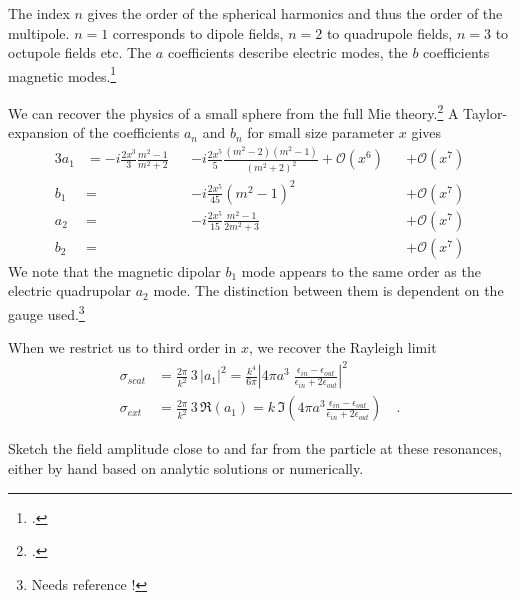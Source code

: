 The index $n$ gives the order of the spherical harmonics and thus the order of the multipole. $n=1$ corresponds to dipole fields, $n=2$ to quadrupole fields, $n=3$ to octupole fields etc. The $a$ coefficients describe electric modes, the $b$ coefficients magnetic modes.\footcite{KV-book, BH-book} 


We can recover the physics of a small sphere from the full Mie theory.\footcite[chapter 5]{BH-book} A Taylor-expansion of the coefficients $a_n$ and $b_n$ for small size parameter $x$ gives
\begin{alignat}{3}
 a_1 &= -i \frac{2x^3}{3} \frac{m^2 -1}{m^2 + 2} && -i \frac{2x^5}{5} \frac{(m^2 -2)(m^2-1)}{(m^2 + 2)^2} + \mathcal{O}(x^6)  && + \mathcal{O}(x^7) \\
 b_1 &=  && -i \frac{2x^5}{45} (m^2 -1)^2  &&+ \mathcal{O}(x^7)  \\
 a_2 &=   &&-i \frac{2x^5}{15} \frac{m^2-1}{2 m^2 +3} &&+ \mathcal{O}(x^7)  \\
b_2 &= && &&+ \mathcal{O}(x^7)  
\end{alignat}
We note that the magnetic dipolar $b_1$ mode appears to the same order as the electric quadrupolar $a_2$ mode. The distinction between them is dependent on the gauge used.\footnote{Needs reference !}

When we restrict us to third order in $x$, we recover the Rayleigh limit
\begin{eqnarray}
\sigma_{scat} & = \frac{2 \pi }{k^2} \, 3 \, \left| a_1 \right|^2 
 = \frac{k^4}{6 \pi} \left| 4 \pi a^3  \; \frac{\epsilon_{in} - \epsilon_{out}}{\epsilon_{in} + 2 \epsilon_{out}} \right|^2 \\
\sigma_{ext} & = \frac{2 \pi }{k^2} \, 3 \, \Re \left( a_1 \right) 
= k \, \Im \left( 4 \pi a^3 \frac{\epsilon_{in} - \epsilon_{out}}{\epsilon_{in} + 2 \epsilon_{out}}  \right) \quad .
\end{eqnarray}



\begin{questions}
\item Sketch the field amplitude close to and far from the particle at these resonances, either by hand based on analytic solutions or numerically.
\end{questions}


\printbibliography[segment=\therefsegment,heading=subbibliography]
